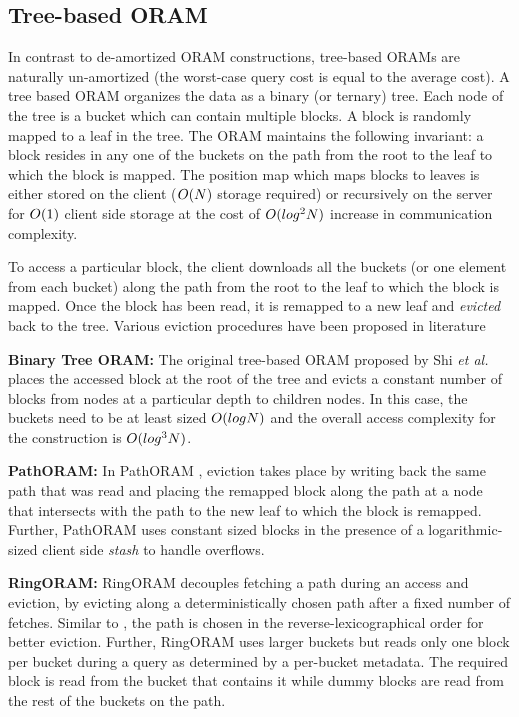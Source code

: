 \subsection{Tree-based ORAM}
\label{oram:related:tree}
%
In contrast to de-amortized ORAM constructions, tree-based ORAMs are naturally un-amortized (the worst-case query cost is equal to the average cost). 
A tree based ORAM organizes the data as a binary (or ternary) tree. Each node of the tree is a bucket which can contain multiple blocks. 
A block is randomly mapped to a leaf in the tree. The ORAM maintains the following invariant: a block resides in any one of the buckets on the 
path from the root to the leaf to which the block is mapped. The position map which maps blocks to leaves is either stored on the client ($O(N)$ 
storage required) or recursively on the server for $O(1)$ client side storage at the cost of $O(log^{2}N)$ increase in communication 
complexity.

To access a particular block, the client downloads all the buckets (or one element from each bucket) along the path from 
the root to the leaf to which the block is mapped. Once the block has been read, it is remapped to a new leaf and {\em evicted} 
back to the tree. Various eviction procedures have been proposed in literature \cite{circuitoram,pathoram,ringoram,binarytreeoram,clporam}

{\bf Binary Tree ORAM:} The original tree-based ORAM proposed by Shi {\em et al.} \cite{binarytreeoram} 
places the accessed block at the root of the tree and 
evicts a constant number of blocks from nodes at a particular depth to children nodes. In this case, the buckets need to be at least sized 
$O(logN)$ and the overall access complexity for the construction is $O(log^{3}N)$.

{\bf PathORAM:} In PathORAM \cite{pathoram}, eviction takes place by writing back the same path that was read and placing the remapped block 
along the path at a node that intersects with the path to the new leaf to which the block is remapped. Further, PathORAM \cite{pathoram} uses constant 
sized blocks in the presence of a logarithmic-sized client side {\em stash} to handle overflows.

{\bf RingORAM:} RingORAM decouples fetching a path during an access and eviction, by evicting along a deterministically chosen path after a fixed number of fetches. 
Similar to \cite{GentryORAM}, the path is chosen in the reverse-lexicographical order for better eviction. Further, RingORAM uses larger buckets but reads 
only one block per bucket during a query as determined by a per-bucket metadata. The required block is read from the bucket that contains it while dummy 
blocks are read from the rest of the buckets on the path.

